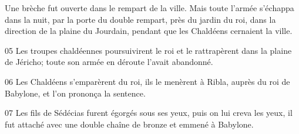 
Une brèche fut ouverte dans le rempart de la ville. Mais toute l’armée s’échappa dans la nuit, par la porte du double rempart, près du jardin du roi, dans la direction de la plaine du Jourdain, pendant que les Chaldéens cernaient la ville.

05 Les troupes chaldéennes poursuivirent le roi et le rattrapèrent dans la plaine de Jéricho; toute son armée en déroute l’avait abandonné.

06 Les Chaldéens s’emparèrent du roi, ils le menèrent à Ribla, auprès du roi de Babylone, et l’on prononça la sentence.

07 Les fils de Sédécias furent égorgés sous ses yeux, puis on lui creva les yeux, il fut attaché avec une double chaîne de bronze et emmené à Babylone.
